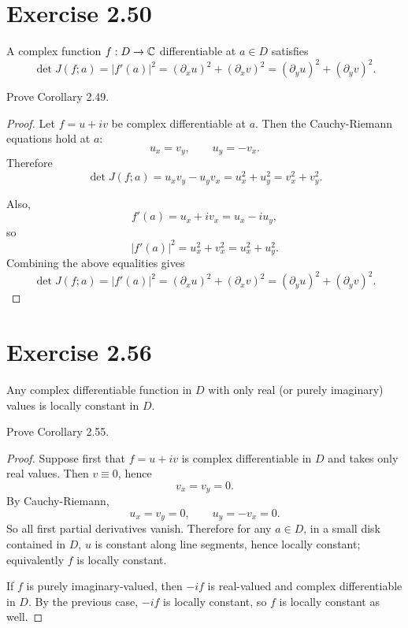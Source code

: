\documentclass{article}
\begin{document}
\section{Exercise 2.50}

\begin{corollary}[Corollary 2.49]
  A complex function $f : D \to \mathbb{C}$ differentiable at $a \in D$ satisfies
  \[
    \det J(f;a) = |f'(a)|^2
    = (\partial_x u)^2 + (\partial_x v)^2
    = (\partial_y u)^2 + (\partial_y v)^2.
  \]
\end{corollary}

Prove Corollary 2.49.

\begin{proof}
  Let $f=u+iv$ be complex differentiable at $a$. Then the Cauchy-Riemann
  equations hold at $a$:
  \[
    u_x=v_y,\qquad u_y=-v_x.
  \]
  Therefore
  \[
    \det J(f;a)=u_x v_y-u_y v_x=u_x^2+u_y^2=v_x^2+v_y^2.
  \]

  Also,
  \[
    f'(a)=u_x+i v_x=u_x-i u_y,
  \]
  so
  \[
    |f'(a)|^2=u_x^2+v_x^2=u_x^2+u_y^2.
  \]
  Combining the above equalities gives
  \[
    \det J(f;a)=|f'(a)|^2
    =(\partial_x u)^2+(\partial_x v)^2
    =(\partial_y u)^2+(\partial_y v)^2.
  \]
\end{proof}

\section{Exercise 2.56}

\begin{corollary}[Corollary 2.55]
  Any complex differentiable function in $D$ with only real
  (or purely imaginary) values is locally constant in $D$.
\end{corollary}

Prove Corollary 2.55.

\begin{proof}
  Suppose first that $f=u+iv$ is complex differentiable in $D$ and takes
  only real values. Then $v\equiv 0$, hence
  \[
    v_x=v_y=0.
  \]
  By Cauchy-Riemann,
  \[
    u_x=v_y=0,\qquad u_y=-v_x=0.
  \]
  So all first partial derivatives vanish. Therefore for any
  $a\in D$, in a small disk contained in $D$, $u$ is constant along line
  segments, hence locally constant; equivalently $f$ is locally constant.

  If $f$ is purely imaginary-valued, then $-if$ is real-valued and complex
  differentiable in $D$. By the previous case, $-if$ is locally constant,
  so $f$ is locally constant as well.
\end{proof}
\end{document}
